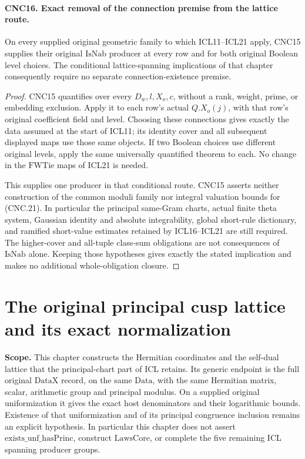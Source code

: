 \documentclass[11pt,a4paper]{article}
\numberwithin{equation}{section}
\theoremstyle{remark}\newtheorem{remark}[theorem]{Remark}
\begin{document}
\paragraph{CNC16. Exact removal of the connection premise from the lattice route.}
\label{claim:CNC16}
On every supplied original geometric family to which ICL11--ICL21
apply, CNC15 supplies their original \(\mathrm{IsNab}\) producer
at every row and for both original Boolean level choices.  The
conditional lattice-spanning implications of that chapter consequently
require no separate connection-existence premise.
\begin{proof}
CNC15 quantifies over every \(D_w,l,X_o,c\), without a rank,
weight, prime, or embedding exclusion.  Apply it to each row's actual
\(Q.X_o(j)\), with that row's original coefficient field and level.
Choosing these connections gives exactly the data assumed at the start
of ICL11; its identity cover and all subsequent displayed maps use those
same objects.  If two Boolean choices use different original levels,
apply the same universally quantified theorem to each.  No change in
the \(\mathrm{FWTie}\) maps of ICL21 is needed.

This supplies one producer in that conditional route.  CNC15 asserts
neither construction of the common moduli family nor integral
valuation bounds for (CNC.21).  In particular the principal
same-Gram charts, actual finite theta system, Gaussian identity and
absolute integrability, global short-rule dictionary, and ramified
short-value estimates retained by ICL16--ICL21 are still required.
The higher-cover and all-tuple class-sum obligations are not consequences
of \(\mathrm{IsNab}\) alone.  Keeping those hypotheses gives exactly
the stated implication and makes no additional whole-obligation closure.
\end{proof}


\section{The original principal cusp lattice and its exact normalization}
\label{sec:principal-cusp-lattices-v047}

\noindent\textbf{Scope.}
This chapter constructs the Hermitian coordinates and the self-dual
lattice that the principal-chart part of ICL retains.  Its generic
endpoint is the full original \(\mathrm{DataX}\) record, on the same
\(\mathrm{Data}\), with the same Hermitian matrix, scalar, arithmetic
group and principal modulus.  On a supplied original uniformization
it gives the exact host denominators and their logarithmic bounds.
Existence of that uniformization and of its principal congruence
inclusion remains an explicit hypothesis.  In particular this chapter
does not assert \(\mathrm{exists\_\allowbreak unf\_\allowbreak hasPrinc}\), construct
\(\mathrm{LawsCore}\), or complete the five remaining ICL spanning
producer groups.
\end{document}
